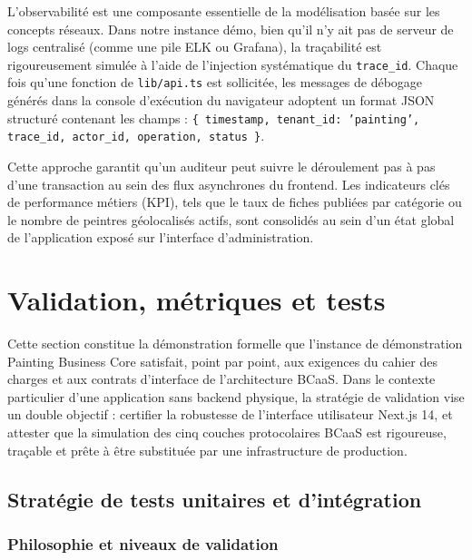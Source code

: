 \documentclass[12pt,a4paper]{report}
\begin{document}
L'observabilité est une composante essentielle de la modélisation basée sur les concepts réseaux. Dans notre instance démo, bien qu'il n'y ait pas de serveur de logs centralisé (comme une pile ELK ou Grafana), la traçabilité est rigoureusement simulée à l'aide de l'injection systématique du \texttt{trace\_id}. Chaque fois qu'une fonction de \texttt{lib/api.ts} est sollicitée, les messages de débogage générés dans la console d'exécution du navigateur adoptent un format JSON structuré contenant les champs : \texttt{\{ timestamp, tenant\_id: 'painting', trace\_id, actor\_id, operation, status \}}.

Cette approche garantit qu'un auditeur peut suivre le déroulement pas à pas d'une transaction au sein des flux asynchrones du frontend. Les indicateurs clés de performance métiers (KPI), tels que le taux de fiches publiées par catégorie ou le nombre de peintres géolocalisés actifs, sont consolidés au sein d'un état global de l'application exposé sur l'interface d'administration.

\newpage
\section{Validation, métriques et tests}

Cette section constitue la démonstration formelle que l'instance de démonstration Painting Business Core satisfait, point par point, aux exigences du cahier des charges et aux contrats d'interface de l'architecture BCaaS. Dans le contexte particulier d'une application sans backend physique, la stratégie de validation vise un double objectif : certifier la robustesse de l'interface utilisateur Next.js 14, et attester que la simulation des cinq couches protocolaires BCaaS est rigoureuse, traçable et prête à être substituée par une infrastructure de production.

\subsection{Stratégie de tests unitaires et d'intégration}

\subsubsection*{Philosophie et niveaux de validation}
\end{document}
